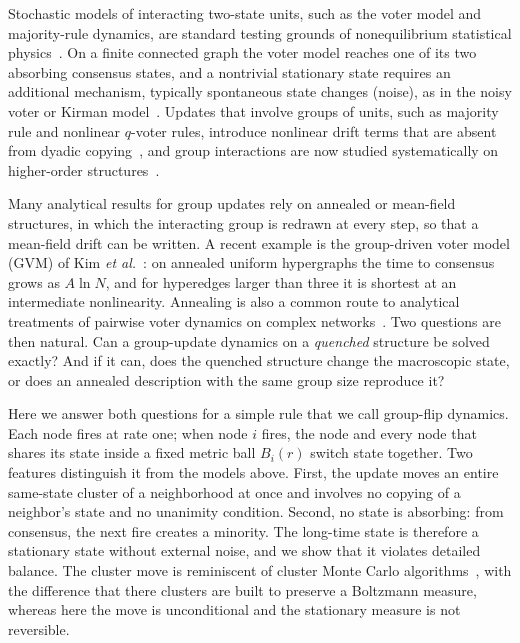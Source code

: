 \documentclass[aps,pre,reprint,superscriptaddress,amsmath,amssymb,longbibliography]{revtex4-2}
\theoremstyle{remark}
\begin{document}
Stochastic models of interacting two-state units, such as the voter
model and majority-rule dynamics, are standard testing grounds of
nonequilibrium statistical
physics~\cite{CliffordSudbury1973,HolleyLiggett1975,deOliveira1992,Krapivsky2003,Castellano2009,Redner2019}.
On a finite connected graph the voter model reaches one of its two
absorbing consensus states, and a nontrivial stationary state requires
an additional mechanism, typically spontaneous state changes (noise), as
in the noisy voter or Kirman
model~\cite{Kirman1993,GranovskyMadras1995,Carro2016}. Updates that
involve groups of units, such as majority rule and nonlinear $q$-voter
rules, introduce nonlinear drift terms that are absent from dyadic
copying~\cite{Krapivsky2003,Castellano2009qvoter,Neuhauser2020,Sahasrabuddhe2021,Noonan2021},
and group interactions are now studied systematically on higher-order
structures~\cite{Battiston2020,Iacopini2019}.

Many analytical results for group updates rely on annealed or
mean-field structures, in which the interacting group is redrawn at every step, so
that a mean-field drift can be written. A recent example is the
group-driven voter model (GVM) of Kim \emph{et al.}~\cite{Kim2025}: on
annealed uniform hypergraphs the time to consensus grows as
$A\ln N$, and for hyperedges larger than three it is shortest at an
intermediate nonlinearity. Annealing
is also a common route to analytical
treatments of pairwise voter dynamics on complex
networks~\cite{Vilone2004,Carro2016}. Two questions are then natural.
Can a group-update dynamics on a \emph{quenched} structure be solved
exactly? And if it can, does the quenched structure change the
macroscopic state, or does an annealed description with the same group
size reproduce it?

Here we answer both questions for a simple rule that we call group-flip
dynamics. Each node fires at rate one; when node $i$ fires, the node and
every node that shares its state inside a fixed metric ball $B_i(r)$
switch state together. Two features distinguish it from the models
above. First, the update moves an entire same-state cluster of a
neighborhood at once and involves no copying of a neighbor's state and
no unanimity condition. Second, no state is absorbing: from consensus,
the next fire creates a minority. The long-time state is therefore a
stationary state without external noise, and we show that it violates
detailed balance. The cluster move is reminiscent of cluster Monte Carlo
algorithms~\cite{SwendsenWang1987}, with the difference that there
clusters are built to preserve a Boltzmann measure, whereas here the
move is unconditional and the stationary measure is not reversible.
\end{document}
